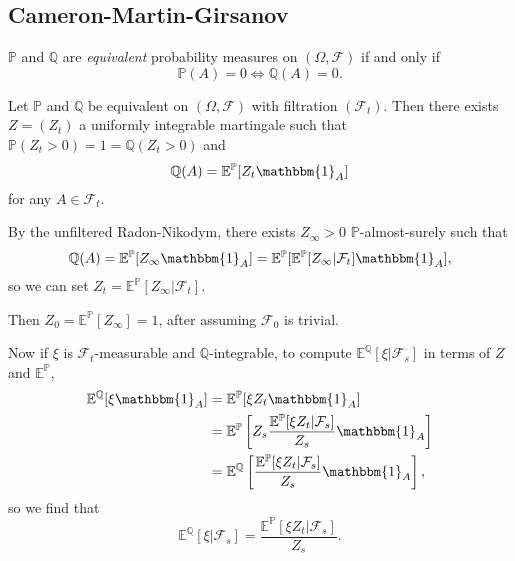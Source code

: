 \documentclass[12pt]{article}
\begin{document}
\subsection{Cameron-Martin-Girsanov}%
\label{sub:cmg}

\begin{definition}
	$\mathbb{P}$ and $\mathbb{Q}$ are \emph{equivalent} probability measures on $(\Omega, \mathcal{F})$ if and only if
	\[
	\mathbb{P}(A) = 0 \iff \mathbb{Q}(A) = 0.
	\]
\end{definition}

\begin{theorem}
	Let $\mathbb{P}$ and $\mathbb{Q}$ be equivalent on $(\Omega, \mathcal{F})$ with filtration $(\mathcal{F}_t)$. Then there exists $Z = (Z_t)$ a uniformly integrable martingale such that $\mathbb{P}(Z_t > 0) = 1  = \mathbb{Q}(Z_t > 0)$ and
	\[
	\mathbb{Q}(A) = \mathbb{E}^{\mathbb{P}}[Z_t \mathbbm{1}_{A}]
	\]
	for any $A \in \mathcal{F}_t$.
\end{theorem}

\begin{proofbox}
	By the unfiltered Radon-Nikodym, there exists $Z_\infty > 0$ $\mathbb{P}$-almost-surely such that
	\[
		\mathbb{Q}(A) = \mathbb{E}^{\mathbb{P}}[Z_\infty \mathbbm{1}_{A}] = \mathbb{E}^{\mathbb{P}}[\mathbb{E}^{\mathbb{P}}[Z_\infty | \mathcal{F}_t] \mathbbm{1}_{A}],
	\]
	so we can set $Z_t = \mathbb{E}^{\mathbb{P}}[Z_\infty|\mathcal{F}_t]$.

	Then $Z_0 = \mathbb{E}^{\mathbb{P}}[Z_\infty] = 1$, after assuming $\mathcal{F}_0$ is trivial.
\end{proofbox}

Now if $\xi$ is $\mathcal{F}_t$-measurable and $\mathbb{Q}$-integrable, to compute $\mathbb{E}^{\mathbb{Q}}[\xi|\mathcal{F}_s]$ in terms of $Z$ and $\mathbb{E}^{\mathbb{P}}$,
	\begin{align*}
		\mathbb{E}^{\mathbb{Q}}[\xi \mathbbm{1}_{A}] &= \mathbb{E}^{\mathbb{P}}[\xi Z_t \mathbbm{1}_{A}] \\
							     &= \mathbb{E}^{\mathbb{P}}\left[ Z_s \frac{\mathbb{E}^{\mathbb{P}}[\xi Z_t | \mathcal{F}_s]}{Z_s} \mathbbm{1}_{A} \right] \\
							     &= \mathbb{E}^{\mathbb{Q}}\left[ \frac{\mathbb{E}^{\mathbb{P}}[\xi Z_t | \mathcal{F}_s]}{Z_s} \mathbbm{1}_{A} \right],
	\end{align*}
	so we find that
	\[
	\mathbb{E}^{\mathbb{Q}}[\xi | \mathcal{F}_s] = \frac{\mathbb{E}^{\mathbb{P}}[\xi Z_t | \mathcal{F}_s]}{Z_s}.
	\]
\end{document}
